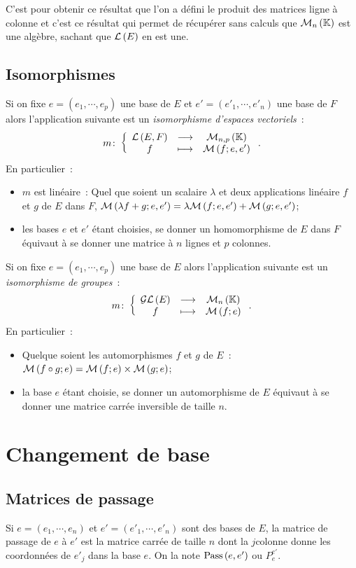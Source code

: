 \begin{remarque}
	C'est pour obtenir ce résultat que l'on a défini le produit des matrices ligne à colonne et c'est ce résultat qui permet de récupérer sans calculs que $\mathcal{M}_{n}\left(\mathbb{K}\right)$ est une algèbre, sachant que $\mathcal{L}\left(E\right)$ en est une.
\end{remarque}

\subsection{Isomorphismes}
Si on fixe $e=(e_1, \cdots, e_p)$ une base de $E$ et $e'=(e'_1, \cdots, e'_n)$ une base de $F$ alors l'application suivante est un \emph{isomorphisme d'espaces vectoriels}~:
\begin{equation}
	m\colon \left\{\begin{array}{ccc} \mathcal{L}\left(E,F\right) & \longrightarrow &\mathcal{M}_{n,p}\left(\mathbb{K}\right)\\ f & \longmapsto & \mathcal{M}\left(f;e,e'\right) \end{array} \right..
\end{equation}
En particulier~:
\begin{itemize}
	\item $m$ est linéaire~: Quel que soient un scalaire $\lambda$ et deux applications linéaire $f$ et $g$ de $E$ dans $F$, $\mathcal{M}\left(\lambda f + g;e,e'\right) = \lambda \mathcal{M}\left(f;e,e'\right) + \mathcal{M}\left(g;e,e'\right)$;
	\item les bases $e$ et $e'$ étant choisies, se donner un homomorphisme de $E$ dans $F$ équivaut à se donner une matrice à $n$ lignes et $p$ colonnes.
\end{itemize}

Si on fixe $e=(e_1, \cdots, e_p)$ une base de $E$ alors l'application suivante est un \emph{isomorphisme de groupes}~:
\begin{equation}
	m\colon \left\{\begin{array}{ccc} \mathcal{GL}\left(E\right) & \longrightarrow &\mathcal{M}_{n}\left(\mathbb{K}\right)\\ f & \longmapsto & \mathcal{M}\left(f;e\right) \end{array} \right..
\end{equation}
En particulier~:
\begin{itemize}
	\item Quelque soient les automorphismes $f$ et $g$ de $E$~: $\mathcal{M}\left(f\circ g;e\right) = \mathcal{M}\left(f;e\right) \times \mathcal{M}\left(g;e\right)$;
	\item la base $e$ étant choisie, se donner un automorphisme de $E$ équivaut à se donner une matrice carrée inversible de taille $n$.
\end{itemize}

\section{Changement de base}
\subsection{Matrices de passage}
\begin{defdef}
	Si $e=(e_1, \cdots, e_n)$ et $e'=(e'_1, \cdots, e'_n)$ sont des bases de $E$, la matrice de passage de $e$ à $e'$ est la matrice carrée de taille $n$ dont la $j$\ieme colonne donne les coordonnées de $e'_j$ dans la base $e$. On la note $\text{Pass}\left(e,e'\right)$ ou $P_e^{e'}$.
\end{defdef}

